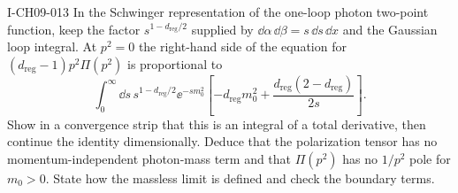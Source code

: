\begin{exercise}{I-CH09-013}
In the Schwinger representation of the one-loop photon two-point function,
keep the factor $s^{1-d_{\mathrm{reg}}/2}$ supplied by
$\dd\alpha\,\dd\beta=s\,\dd s\,\dd x$ and the Gaussian loop integral.  At
$p^2=0$ the right-hand side of the equation for
$(d_{\mathrm{reg}}-1)p^2\Pi(p^2)$ is proportional to
\[
  \int_0^\infty\dd s\,s^{1-d_{\mathrm{reg}}/2}\ee^{-sm_0^2}
  \left[-d_{\mathrm{reg}}m_0^2
  +\frac{d_{\mathrm{reg}}(2-d_{\mathrm{reg}})}{2s}\right].
\]
Show in a convergence strip that this is an integral of a total derivative,
then continue the identity dimensionally.  Deduce that the polarization tensor
has no momentum-independent photon-mass term and that $\Pi(p^2)$ has no
$1/p^2$ pole for $m_0>0$.  State how the massless limit is defined and check
the boundary terms.
\end{exercise}
